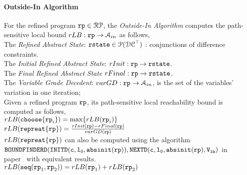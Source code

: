 \paragraph*{Outside-In Algorithm}
For the refined program $\mathtt{rp} \in \mathcal{RP}$, the \emph{Outside-In Algorithm}
computes the path-sensitive local bound 
$rLB: \mathtt{rp} \to \mathcal{A}_{in}$ as follows,
\\
The \emph{Refined Abstract State}: 
$\mathtt{rstate} \in \mathcal{P}(\mathcal{DC}^{\top})$ : conjunctions of difference constraints.
\\
The \emph{Initial Refined Abstract State}: $rInit : \mathtt{rp} \to \mathtt{rstate} $.
\\
The \emph{Final Refined Abstract State} $rFinal : \mathtt{rp} \to \mathtt{rstate} $.
\\
The \emph{Variable Grade Decedent}: $varGD : \mathtt{rp} \to \mathcal{A}_{in}$, is the set of the variables' variation in one iteration;
\\
Given a refined program $\mathtt{rp}$, its path-sensitive local reachability bound is computed as follows,
\\
$rLB(\mathtt{choose}\{\mathtt{rp}_i\}) =  \max\{rLB(\mathtt{rp}_i)\}$
\\
$rLB(\mathtt{repreat}\{\mathtt{rp}\}) =  \frac{rInit(\mathtt{rp}) - rFinal(\mathtt{rp})}{varGD(\mathtt{rp})}$
\\
$rLB(\mathtt{repreat}\{\mathtt{rp}\})$ can also be computed using the algorithm 
$\mathtt{BOUNDFINDERD(INITD(c, l_0, \mathtt{abs}{\mathtt{init}}(\mathtt{rp})), NEXTD(c, l_0, \mathtt{abs}{\mathtt{init}}(\mathtt{rp}), V_{\mathtt{in}} )}$ 
in paper~\cite{GulwaniJK09} with equivalent results.
\\
$rLB(\mathtt{seq}(\mathtt{rp}_1, \mathtt{rp}_2)) =  rLB(\mathtt{rp}_1)+ rLB( \mathtt{rp}_2)$
\\
